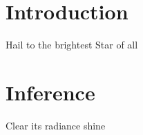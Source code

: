 

\section{Introduction} \label{sec:Introduction}

Hail to the brightest Star of all

\section{Inference} \label{sec:Inference}

Clear its radiance shine